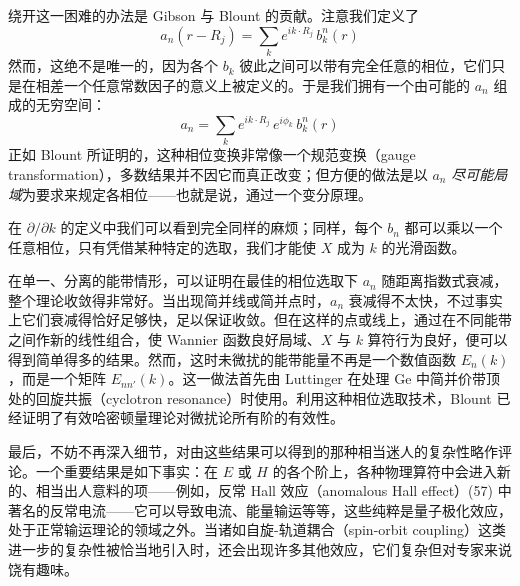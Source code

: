 绕开这一困难的办法是 Gibson 与 Blount 的贡献。注意我们定义了
\begin{equation*}
a_n(r - R_j) = \sum_k e^{ik\cdot R_j}\,b^n_k(r)
\end{equation*}
然而，这绝不是唯一的，因为各个 $b_k$ 彼此之间可以带有完全任意的相位，它们只是在相差一个任意常数因子的意义上被定义的。于是我们拥有一个由可能的 $a_n$ 组成的无穷空间：
\begin{equation*}
a_n = \sum_k e^{ik\cdot R_j}\,e^{i\phi_k}\,b^n_k(r)
\end{equation*}
正如 Blount 所证明的，这种相位变换非常像一个规范变换（gauge transformation），多数结果并不因它而真正改变；但方便的做法是以 $a_n$ \emph{尽可能局域}为要求来规定各相位——也就是说，通过一个变分原理。

在 $\partial/\partial k$ 的定义中我们可以看到完全同样的麻烦；同样，每个 $b_n$ 都可以乘以一个任意相位，只有凭借某种特定的选取，我们才能使 $X$ 成为 $k$ 的光滑函数。

在单一、分离的能带情形，可以证明在最佳的相位选取下 $a_n$ 随距离指数式衰减，整个理论收敛得非常好。当出现简并线或简并点时，$a_n$ 衰减得不太快，不过事实上它们衰减得恰好足够快，足以保证收敛。但在这样的点或线上，通过在不同能带之间作新的线性组合，使 Wannier 函数良好局域、$X$ 与 $k$ 算符行为良好，便可以得到简单得多的结果。然而，这时未微扰的能带能量不再是一个数值函数 $E_n(k)$，而是一个矩阵 $E_{nn'}(k)$。这一做法首先由 Luttinger 在处理 Ge 中简并价带顶处的回旋共振（cyclotron resonance）时使用。利用这种相位选取技术，Blount 已经证明了有效哈密顿量理论对微扰论所有阶的有效性。

最后，不妨不再深入细节，对由这些结果可以得到的那种相当迷人的复杂性略作评论。一个重要结果是如下事实：在 $E$ 或 $H$ 的各个阶上，各种物理算符中会进入新的、相当出人意料的项——例如，反常 Hall 效应（anomalous Hall effect）(57) 中著名的反常电流——它可以导致电流、能量输运等等，这些纯粹是量子极化效应，处于正常输运理论的领域之外。当诸如自旋-轨道耦合（spin-orbit coupling）这类进一步的复杂性被恰当地引入时，还会出现许多其他效应，它们复杂但对专家来说饶有趣味。
